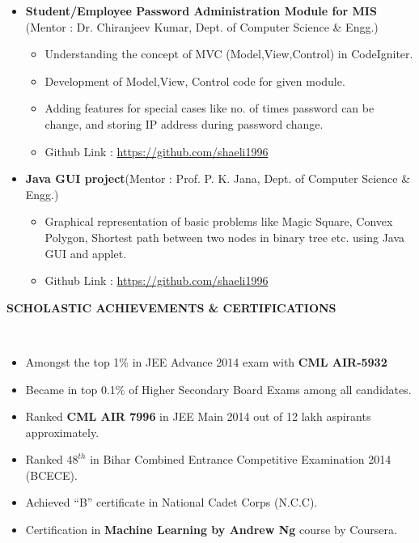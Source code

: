 \documentclass[a4paper,10pt]{article}
\newcommand{\isep}{-2 pt}
\newcommand{\lsep}{-0.5cm}
\newcommand{\resheading}[1]{{\small \colorbox{mygrey}{\begin{minipage}{0.975\textwidth}{\textbf{#1 \vphantom{p\^{E}}}}\end{minipage}}}}
\begin{document}
\begin{itemize}
	\item \textbf{Student/Employee Password Administration Module for MIS} (Mentor : Dr. Chiranjeev Kumar, Dept. of Computer Science \& Engg.) \\[-0.6cm]
	\begin{itemize}\itemsep \isep
	\item Understanding the concept of MVC (Model,View,Control) in CodeIgniter.
	\item Development of Model,View, Control code for given module.
	\item Adding features for special cases like no. of times password can be change, and storing IP address during password change.
	\item Github Link : \url{https://github.com/shaeli1996}
	\end{itemize}
	\item \textbf{Java GUI project}(Mentor : Prof. P. K. Jana, Dept. of Computer Science \& Engg.)
	\begin{itemize} \itemsep \isep
	\item Graphical representation of basic problems like Magic Square, Convex Polygon, Shortest path between two nodes in binary tree etc. using Java GUI and applet.
	\item Github Link : \url{https://github.com/shaeli1996}
	\end{itemize}
\end{itemize}

\resheading{\textbf{SCHOLASTIC ACHIEVEMENTS \& CERTIFICATIONS} }\\[\lsep]
\begin{itemize}
\item \noindent Amongst the top 1\% in JEE Advance 2014 exam with \textbf{CML AIR-5932}
\item \noindent Became in top 0.1\% of Higher Secondary Board Exams among all candidates.
\item \noindent Ranked \textbf{CML AIR 7996} in JEE Main 2014 out of 12 lakh aspirants approximately.
\item \noindent Ranked $48^{th}$ in Bihar Combined Entrance Competitive Examination 2014 (BCECE).
\item \noindent Achieved “B” certificate in National Cadet Corps (N.C.C).
\item \noindent Certification in \textbf{Machine Learning by Andrew Ng} course by Coursera.
\end{itemize}
\end{document}
